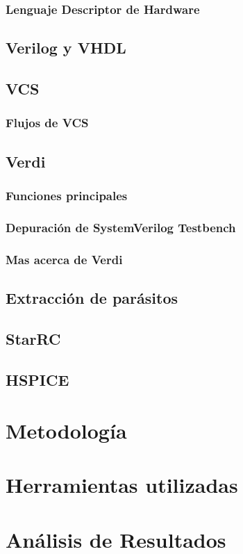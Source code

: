 \subsubsection{Lenguaje Descriptor de Hardware}
\subsection{Verilog y VHDL}
\subsection{VCS}
\subsubsection{Flujos de VCS}
\subsection{Verdi}
\subsubsection{Funciones principales}
\subsubsection{Depuración de SystemVerilog Testbench}
\subsubsection{Mas acerca de Verdi}
\subsection{Extracción de parásitos}
\subsection{StarRC}
\subsection{HSPICE}
\section{Metodología}
\section{Herramientas utilizadas}
\section{Análisis de Resultados}
